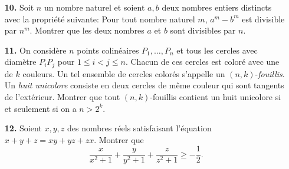 \documentclass[12pt,a4paper]{article}
\theoremstyle{plain}
\theoremstyle{definition}
\theoremstyle{remark}
\begin{document}
\begin{enumerate}
\item[\textbf{10.}] Soit $n$ un nombre naturel et soient $a,b$ deux nombres entiers distincts avec la propri\'et\'e suivante: Pour tout nombre naturel $m$, $a^m-b^m$ est divisible par $n^m$. Montrer que les deux nombres $a$ et $b$ sont divisibles par $n$.\\


\bigskip
\bigskip


\item[\textbf{11.}] On consid\`ere $n$ points colin\'eaires $P_1, \ldots, P_n$ et tous les cercles avec diam\`etre $P_iP_j$ pour $1 \leq i<j \leq n$. Chacun de ces cercles est color\'e avec une de $k$ couleurs. Un tel ensemble de cercles color\'es s'appelle un $(n,k)$-\emph{fouillis}. Un \emph{huit unicolore} consiste en deux cercles de m\^eme couleur qui sont tangents de l'ext\'erieur. Montrer que tout $(n,k)$-fouillis contient un huit unicolore si et seulement si on a $n>2^k$.\\



\bigskip
\bigskip

\item[\textbf{12.}]Soient $x,y,z$ des nombres r\'eels satisfaisant l'\'equation $x+y+z=xy+yz+zx$. 
Montrer que 
\[\frac{x}{x^2+1}+\frac{y}{y^2+1}+\frac{z}{z^2+1} \geq -\frac{1}{2}.\]


\end{enumerate}
\end{document}
